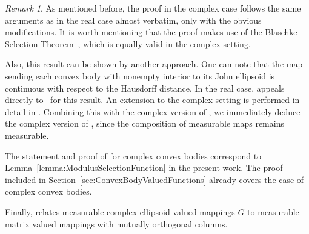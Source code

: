 \documentclass{article}
\theoremstyle{definition}
\theoremstyle{remark}
\newtheorem{remark}[theorem]{Remark}
\numberwithin{equation}{section}
\newcommand{\1}{\mathbf{1}}
\begin{document}
    \begin{remark}
        As mentioned before, the proof in the complex case follows the same arguments as in the real case almost verbatim, only with the obvious modifications.
        It is worth mentioning that the proof makes use of the Blaschke Selection Theorem~\cite[Theorem~1.8.7]{Schneider_Convex_Bodie_1993},
        which is equally valid in the complex setting.
        
        Also, this result can be shown by another approach.
        One can note that the map sending each convex body with nonempty interior to its John ellipsoid is continuous with respect to the Hausdorff distance. In the real case, \cite[Subsection~A.4.3]{DKPS2024} appeals directly to~\cite{Mordhorst_2017} for this result. An extension to the complex setting is performed in detail in \cite[Subsection~A.4.7]{DKPS2024}. Combining this with the complex version of \cite[Theorem 3.5]{Cruz_Uribe_Bownik_Extrapolation}, we immediately deduce the complex version of \cite[Lemma 3.8]{Cruz_Uribe_Bownik_Extrapolation}, since the composition of measurable maps remains measurable.
    \end{remark}

    The statement and proof of \cite[Lemma 3.9]{Cruz_Uribe_Bownik_Extrapolation} for complex convex bodies
    correspond to Lemma~\ref{lemma:ModulusSelectionFunction} in the present work.
    The proof included in Section~\ref{sec:ConvexBodyValuedFunctions} already covers the case of complex convex bodies.
    
    Finally, \cite[Lemma 3.10]{Cruz_Uribe_Bownik_Extrapolation} relates measurable complex ellipsoid valued mappings $G$
    to measurable matrix valued mappings with mutually orthogonal columns.
\end{document}
